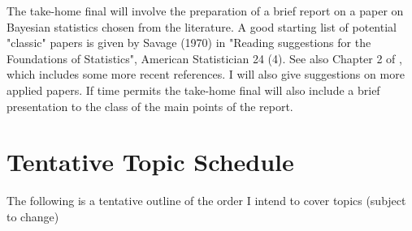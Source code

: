 The take-home final will involve
the preparation of a brief report on a paper on Bayesian statistics chosen from the literature. A good starting list of potential "classic" papers
is given by Savage (1970) in "Reading suggestions for the Foundations of Statistics",
American Statistician 24 (4). See also Chapter 2 of \cite{bernardo94}, which includes
some more recent references. I will also give suggestions on more applied papers. If time permits the take-home final will also
include a brief presentation to the class of the main points of the report.


\section{Tentative Topic Schedule}

The following is a tentative outline of the order I intend to cover topics (subject to change)
